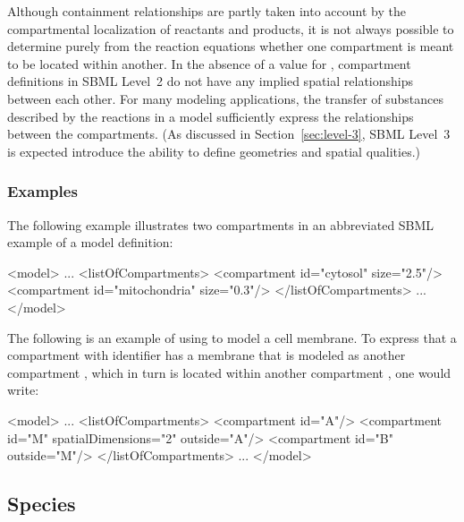 Although containment relationships are partly taken into account
by the compartmental localization of reactants and products, it is
not always possible to determine purely from the reaction
equations whether one compartment is meant to be located within
another.  In the absence of a value for ,
compartment definitions in SBML Level~2 do not have any implied
spatial relationships between each other.  For many modeling
applications, the transfer of substances described by the
reactions in a model sufficiently express the relationships
between the compartments.  (As discussed in
Section~\ref{sec:level-3}, SBML Level~3 is expected introduce the
ability to define geometries and spatial qualities.)


\subsubsection{Examples}

The following example illustrates two compartments in an
abbreviated SBML example of a model definition:

\begin{example}
<model>
    ...
    <listOfCompartments>
        <compartment id="cytosol" size="2.5"/>
        <compartment id="mitochondria" size="0.3"/>
    </listOfCompartments>
    ...
</model>

\end{example}

The following is an example of using  to model a
cell membrane.  To express that a compartment with identifier
 has a membrane that is modeled as another compartment
, which in turn is located within another compartment
, one would write:

\begin{example}
<model>
    ...
    <listOfCompartments>
        <compartment id="A"/>
        <compartment id="M" spatialDimensions="2" outside="A"/>
        <compartment id="B" outside="M"/>
    </listOfCompartments>
    ...
</model>

\end{example}


\subsection{Species}
\label{sec:species}

